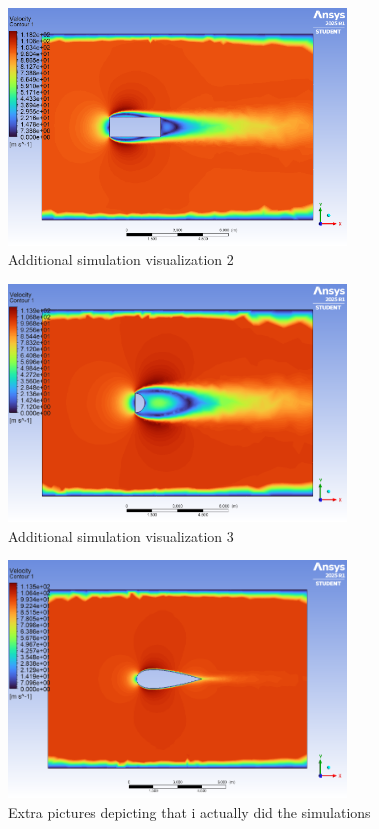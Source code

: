 \documentclass[12pt,a4paper]{article}
\begin{document}
\begin{figure}[H]
\centering
\includegraphics[width=0.8\textwidth]{image10.png}
\caption{Additional simulation visualization 2}
\end{figure}

\begin{figure}[H]
\centering
\includegraphics[width=0.8\textwidth]{image16.png}
\caption{Additional simulation visualization 3}
\end{figure}

\begin{figure}[H]
\centering
\includegraphics[width=0.8\textwidth]{image13.png}
\caption{Extra pictures depicting that i actually did the simulations}
\end{figure}
\end{document}
